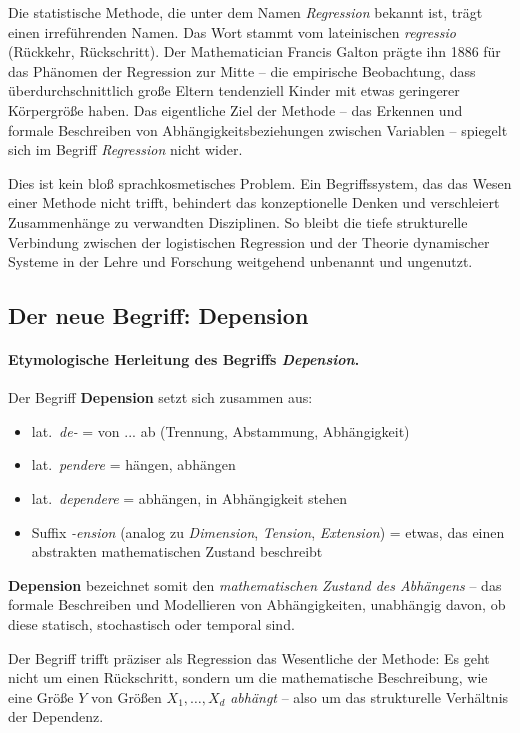 ﻿\documentclass[12pt, a4paper]{article}
\theoremstyle{definition}
\theoremstyle{remark}
\begin{document}
Die statistische Methode, die unter dem Namen \emph{Regression} bekannt ist, trägt einen
irreführenden Namen. Das Wort stammt vom lateinischen \emph{regressio} (Rückkehr,
Rückschritt). Der Mathematician Francis Galton prägte ihn 1886 für das Phänomen der
Regression zur Mitte -- die empirische Beobachtung, dass überdurchschnittlich große
Eltern tendenziell Kinder mit etwas geringerer Körpergröße haben.
Das eigentliche Ziel der Methode -- das Erkennen und formale Beschreiben von
Abhängigkeitsbeziehungen zwischen Variablen -- spiegelt sich im Begriff
\emph{Regression} nicht wider.

Dies ist kein bloß sprachkosmetisches Problem. Ein Begriffssystem, das das Wesen
einer Methode nicht trifft, behindert das konzeptionelle Denken und verschleiert
Zusammenhänge zu verwandten Disziplinen. So bleibt die tiefe strukturelle Verbindung
zwischen der logistischen Regression und der Theorie dynamischer Systeme in der
Lehre und Forschung weitgehend unbenannt und ungenutzt.

\subsection{Der neue Begriff: Depension}

\paragraph*{Etymologische Herleitung des Begriffs \emph{Depension}.}
Der Begriff \textbf{Depension} setzt sich zusammen aus:
\begin{itemize}
  \item lat.\ \emph{de-} = von ... ab (Trennung, Abstammung, Abhängigkeit)
  \item lat.\ \emph{pendere} = hängen, abhängen
  \item lat.\ \emph{dependere} = abhängen, in Abhängigkeit stehen
  \item Suffix \emph{-ension} (analog zu \emph{Dimension}, \emph{Tension}, \emph{Extension})
    = etwas, das einen abstrakten mathematischen Zustand beschreibt
\end{itemize}
\medskip\noindent
\textbf{Depension} bezeichnet somit den \emph{mathematischen Zustand des Abhängens} --
das formale Beschreiben und Modellieren von Abhängigkeiten, unabhängig davon, ob diese
statisch, stochastisch oder temporal sind.

Der Begriff trifft präziser als Regression das Wesentliche der Methode: Es geht
nicht um einen Rückschritt, sondern um die mathematische Beschreibung, wie eine
Größe $Y$ von Größen $X_1, \ldots, X_d$ \emph{abhängt} -- also um das
strukturelle Verhältnis der Dependenz.
\end{document}
